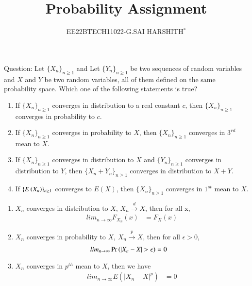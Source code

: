 \documentclass[journal,12pt,twocolumn]{IEEEtran}
\theoremstyle{remark}
\begin{document}

\vspace{3cm}

\title{Probability Assignment}
\author{EE22BTECH11022-G.SAI HARSHITH$^{*}$%
}
\maketitle
\newpage
\bigskip
\renewcommand{\thefigure}{\theenumi}
\renewcommand{\thetable}{\theenumi}

Question: Let $\{X_n\}_{n \geq 1}$ and Let $\{Y_n\}_{n \geq 1}$ be two sequences of random variables and $X$ and $Y$
be two random variables, all of them defined on the same probability space.
Which one of the following statements is true?
\begin{enumerate}[label=(\Alph*)]
\item If $\{X_n\}_{n \geq 1}$ converges in distribution to a real constant $c$, then $\{X_n\}_{n \geq 1}$
converges in probability to $c$.
\item If $\{X_n\}_{n \geq 1}$ converges in probability to $X$, then $\{X_n\}_{n \geq 1}$ converges in $3^{rd}$ mean
to $X$.
\item If $\{X_n\}_{n \geq 1}$ converges in distribution to $X$ and $\{Y_n\}_{n \geq 1}$ converges in
distribution to $Y$, then $\{X_n + Y_n\}_{n \geq 1}$ converges in distribution to $X+Y$.
\item If $\{E\left(X_n\right)\}_{n \geq 1}$ converges to $E(X)$, then $\{X_n\}_{n \geq 1}$ converges in $1^{st}$ mean to $X$.
\end{enumerate}
\solution 
\begin{enumerate}
\item $X_n$ converges in distribution to $X$, $X_n \xrightarrow{d} X$, then for all x,
\begin{align}
lim_{n \to \infty} F_{X_n}(x) &= F_X(x)
\end{align}
\item $X_n$ converges in probability to $X$, $X_n \xrightarrow{p} X$, then for all $\epsilon > 0$,
\begin{align}
lim_{n \to \infty} \pr{|X_n-X|>\epsilon}&=0
\label{eq:1}
\end{align}
\item $X_n$ converges in $p^{th}$ mean to $X$, then we have
\begin{align}
lim_{n \to \infty} E(|X_n-X|^p)&=0
\end{align}
\end{enumerate}
\end{document}
